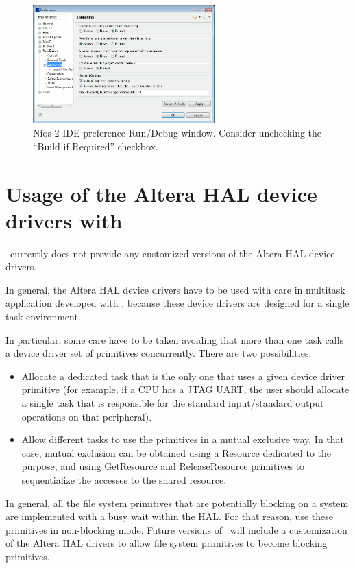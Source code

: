 \begin{figure}
  \begin{center}
    \includegraphics[width=7cm, bb=0 0 717 465]{images/Nios2_buildifrequired.png}
  \end{center}
  \caption{Nios 2 IDE preference Run/Debug window. Consider unchecking the ``Build if Required'' checkbox.}
  \label{fig:Nios2-buildifrequired} 
\end{figure}




\section[Altera Device Drivers]{Usage of the Altera HAL device drivers with \ee}

\ee\ currently does not provide any customized versions of the Altera
HAL device drivers.

In general, the Altera HAL device drivers have to be used with care in
multitask application developed with \ee, because these
device drivers are designed for a single task environment.

In particular, some care have to be taken avoiding that more than one
task calls a device driver set of primitives concurrently. There are
two possibilities:

\begin{itemize}
\item Allocate a dedicated task that is the only one that uses a given
      device driver primitive (for example, if a CPU has a JTAG UART,
      the user should allocate a single task that is responsible for
      the standard input/standard output operations on that
      peripheral).

\item Allow different tasks to use the primitives in a mutual
      exclusive way. In that case, mutual exclusion can be obtained
      using a Resource dedicated to the purpose, and using GetResource
      and ReleaseResource primitives to sequentialize the accesses to
      the shared resource.
\end{itemize}

In general, all the file system primitives that are potentially
blocking on a system are implemented with a busy wait within the
HAL. For that reason, use these primitives in non-blocking mode. Future
versions of \ee\ will include a customization of the Altera HAL drivers
to allow file system primitives to become blocking primitives.



